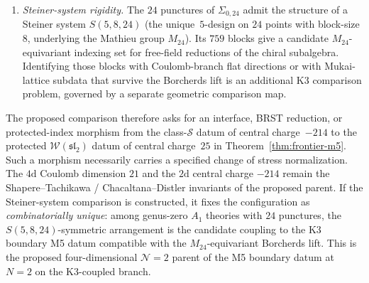 \begin{remark}[Class-$\mathcal S$ $A_1$ on $\Sigma_{0,24}$ as the
$\mathcal N{=}2$ parent of the K3-coupled M5 datum]
\begin{enumerate}[label=\textup{(\roman*)}]
\item \emph{Steiner-system rigidity.}
 The $24$ punctures of $\Sigma_{0,24}$ admit the structure of a
 Steiner system $S(5,8,24)$
 \textup{(}the unique~$5$-design on $24$ points with block-size $8$,
 underlying the Mathieu group $M_{24}$\textup{)}. Its $759$ blocks
 give a candidate $M_{24}$-equivariant indexing set for free-field
 reductions of the chiral subalgebra. Identifying those blocks with
 Coulomb-branch flat directions or with Mukai-lattice subdata that
 survive the Borcherds lift is an additional K3 comparison problem,
 governed by a separate geometric comparison map.
\end{enumerate}
The proposed comparison therefore asks for an interface, BRST
reduction, or protected-index morphism from the class-$\mathcal S$
datum of central charge~$-214$ to the protected
$\mathcal W(\mathfrak{sl}_2)$ datum of central charge~$25$ in
Theorem~\ref{thm:frontier-m5}.  Such a morphism necessarily carries a
specified change of stress normalization.  The $4\mathrm d$ Coulomb dimension
$21$ and the $2\mathrm d$ central charge $-214$ remain the
Shapere--Tachikawa / Chacaltana--Distler invariants of the proposed
parent.
If the Steiner-system comparison is constructed, it fixes the
configuration as \emph{combinatorially unique}: among genus-zero
$A_1$ theories with $24$ punctures, the $S(5,8,24)$-symmetric
arrangement is the candidate coupling to the K3 boundary M5 datum
compatible with the $M_{24}$-equivariant Borcherds lift.
This is the proposed four-dimensional $\mathcal N{=}2$ parent of the
M5 boundary datum at $N=2$ on the K3-coupled branch.
\end{remark}

